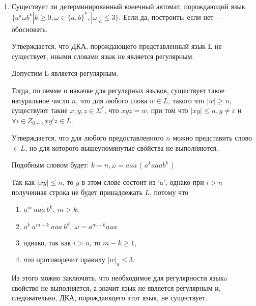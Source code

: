 \documentclass[12pt]{article}
\begin{document}
\bigskip
\begin{enumerate}

\item Существует ли детерминированный конечный автомат, порождающий язык
    $\{ a^k \omega b^k | k \geq 0, \omega \in \{a, b\}^{*}, |\omega|_a \leq 3\}$.
Если да, построить; если нет — обосновать.

Утверждается, что ДКА, порождающего представленный язык L не существует, иными словами язык не является регулярным.

Допустим L является регулярным.

Тогда, по лемме о накачке для регулярных языков, существует такое натуральное число $n$,
что для любого слова $w \in L$, такого что $|w| \geq n$, существуют такие $x, y, z \in \Sigma^*$,
что $xyz=w$, при том что $|xy| \leq n, y \neq \varepsilon$ и $\forall i \in Z_{0+}, xy^iz \in L$.

Утверждается, что для любого предоставленного $n$ можно представить слово $\in L$, но для которого вышеупомянутые свойства не выполняются.

Подобным словом будет: $k=n, \omega = aaa$ ( $a^kaaab^k$ )

Так как $|xy| \leq n$, то $y$ в этом слове состоит из 'a', однако при $i>n$ полученная строка не будет принадлежать $L$, потому что
\begin{enumerate}
        \item $ a^m~aaa~b^k,~m > k $, 
        \item $a^k~a^{m-k}~aaa~b^k,~ \omega= a^{m-k}aaa$
        \item однако, так как $i>n$, то $m - k \geq 1 $,
        \item что противоречит правилу $|w|_a \leq 3$.
\end{enumerate}

Из этого можно заключить, что необходимое для регулярности языкa свойство не выполняется, а значит язык не является регулярным
и, следовательно, ДКА, порождающего этот язык, не существует.

\end{enumerate}
\end{document}
